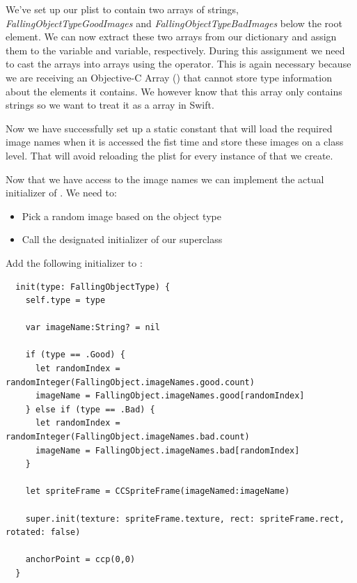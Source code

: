 We've set up our plist to contain two arrays of strings,
\textit{FallingObjectTypeGoodImages} and \textit{FallingObjectTypeBadImages}
below the root element. We can now extract these two arrays from our dictionary
and assign them to the  variable and  variable, respectively. During
this assignment we need to cast the arrays into \inlinecode{[String]} arrays
using the  operator. This is again necessary because we are
receiving an Objective-C Array () that cannot store type information
about the elements it contains. We however know that this array only contains
strings so we want to treat it as a \inlinecode{[String]} array in Swift.

Now we have successfully set up a static constant that will load the required
image names when it is accessed the fist time and store these images on a class
level. That will avoid reloading the plist for every instance of
 that we create.
  
Now that we have access to the image names we can implement the actual
initializer of . We need to:
\begin{itemize}
  \item Pick a random image based on the object type
  \item Call the designated initializer of our superclass \ccsprite{}
\end{itemize}

\begin{leftbar}
Add the following initializer to :
\begin{lstlisting}
  init(type: FallingObjectType) {
    self.type = type
    
    var imageName:String? = nil
    
    if (type == .Good) {
      let randomIndex = randomInteger(FallingObject.imageNames.good.count)
      imageName = FallingObject.imageNames.good[randomIndex]
    } else if (type == .Bad) {
      let randomIndex = randomInteger(FallingObject.imageNames.bad.count)
      imageName = FallingObject.imageNames.bad[randomIndex]
    }
    
    let spriteFrame = CCSpriteFrame(imageNamed:imageName)
    
    super.init(texture: spriteFrame.texture, rect: spriteFrame.rect, rotated: false)
    
    anchorPoint = ccp(0,0)
  }
\end{lstlisting}
\end{leftbar}

